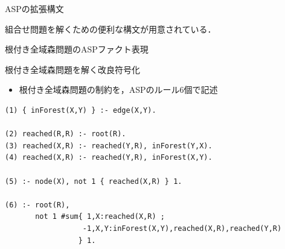 \documentclass[dvipdfmx,11pt]{beamer}
\newcommand{\code}[1]{\lstinline[basicstyle=\ttfamily]{#1}}
\begin{document}
\begin{frame}{ASPの拡張構文}
\begin{alertblock}{}\centering
  組合せ問題を解くための便利な構文が用意されている．
\end{alertblock}
\end{frame}
\begin{frame}{根付き全域森問題のASPファクト表現}
 \begin{figure}
  \centering
  
 \end{figure}\vfill
  \begin{exampleblock}{}\centering
        
  \end{exampleblock}
\end{frame}
\begin{frame}[fragile]{根付き全域森問題を解く改良符号化}
\begin{itemize}
  \item 根付き全域森問題の制約を，ASPのルール6個で記述
\end{itemize}
\begin{minipage}[c]{1.01\textwidth}
\begin{exampleblock}{}\small
\begin{lstlisting}
(1) { inForest(X,Y) } :- edge(X,Y).

(2) reached(R,R) :- root(R).
(3) reached(X,R) :- reached(Y,R), inForest(Y,X).
(4) reached(X,R) :- reached(Y,R), inForest(X,Y).

(5) :- node(X), not 1 { reached(X,R) } 1.

(6) :- root(R),
       not 1 #sum{ 1,X:reached(X,R) ;
                  -1,X,Y:inForest(X,Y),reached(X,R),reached(Y,R) 
                 } 1.
\end{lstlisting}
\end{exampleblock}
\end{minipage}
\end{frame}
\end{document}
